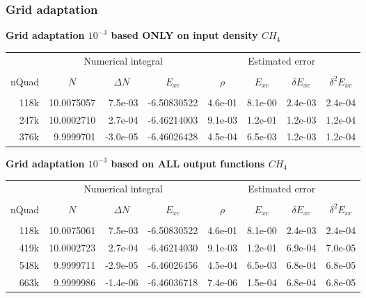 \begin{frame}
\frametitle{Grid adaptation}
\centering

\textbf{Grid adaptation $10^{-3}$ based ONLY on input density $CH_4$}
\begin{table}
\centering
\begin{tabular}{r|rrr|rrrr}
\hline
\hline
\multicolumn{1}{c|}{}&
\multicolumn{3}{c|}{Numerical integral}&
\multicolumn{4}{c}{Estimated error}\\
    &          &        &           &       &       &       &       \\
\multicolumn{1}{c|}{nQuad}&
\multicolumn{1}{c}{$N$}&
\multicolumn{1}{c}{$\Delta N$}&
\multicolumn{1}{c|}{$E_{xc}$}&
\multicolumn{1}{c}{$\rho$}&
\multicolumn{1}{c}{$E_{xc}$}&
\multicolumn{1}{c}{$\delta E_{xc}$}&
\multicolumn{1}{c}{$\delta^2 E_{xc}$}\\
    &          &        &           &       &       &       &       \\
118k&10.0075057& 7.5e-03&-6.50830522&4.6e-01&8.1e-00&2.4e-03&2.4e-04\\
247k&10.0002710& 2.7e-04&-6.46214003&9.1e-03&1.2e-01&1.2e-03&1.2e-04\\
376k& 9.9999701&-3.0e-05&-6.46026428&4.5e-04&6.5e-03&1.2e-03&1.2e-04\\
\hline
\hline
\end{tabular}
\end{table}

\vspace{10mm}

\textbf{Grid adaptation $10^{-3}$ based on ALL output functions $CH_4$}
\begin{table}
\centering
\begin{tabular}{r|rrr|rrrr}
\hline
\hline
\multicolumn{1}{c|}{}&
\multicolumn{3}{c|}{Numerical integral}&
\multicolumn{4}{c}{Estimated error}\\
    &          &        &           &       &       &       &       \\
\multicolumn{1}{c|}{nQuad}&
\multicolumn{1}{c}{$N$}&
\multicolumn{1}{c}{$\Delta N$}&
\multicolumn{1}{c|}{$E_{xc}$}&
\multicolumn{1}{c}{$\rho$}&
\multicolumn{1}{c}{$E_{xc}$}&
\multicolumn{1}{c}{$\delta E_{xc}$}&
\multicolumn{1}{c}{$\delta^2 E_{xc}$}\\
    &          &        &           &       &       &       &       \\
118k&10.0075061& 7.5e-03&-6.50830522&4.6e-01&8.1e-00&2.4e-03&2.4e-04\\
419k&10.0002723& 2.7e-04&-6.46214030&9.1e-03&1.2e-01&6.9e-04&7.0e-05\\
548k& 9.9999711&-2.9e-05&-6.46026456&4.5e-04&6.5e-03&6.8e-04&6.8e-05\\
663k& 9.9999986&-1.4e-06&-6.46036718&7.4e-06&1.5e-04&6.8e-04&6.8e-05\\
       
\hline
\hline
\end{tabular}
\end{table}
\end{frame}

